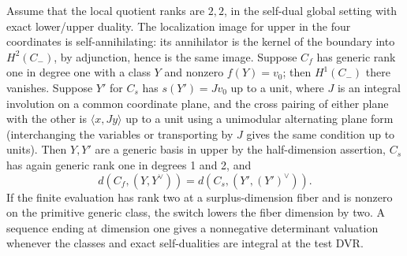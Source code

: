 \begin{lemma}\label{lem:foundations-square}
Assume that the local quotient ranks are \(2,2\), in the self-dual global setting with exact lower/upper duality. The localization image for upper in the four coordinates is self-annihilating: its annihilator is the kernel of the boundary into \(H^2(C_-)\), by adjunction, hence is the same image. Suppose \(C_f\) has generic rank one in degree one with a class \(Y\) and nonzero \(f(Y)=v_0\); then \(H^1(C_-)\) there vanishes. Suppose \(Y'\) for \(C_s\) has \(s(Y')=J v_0\) up to a unit, where \(J\) is an integral involution on a common coordinate plane, and the cross pairing of either plane with the other is \(\langle x,Jy\rangle\) up to a unit using a unimodular alternating plane form (interchanging the variables or transporting by \(J\) gives the same condition up to units). Then \(Y,Y'\) are a generic basis in upper by the half-dimension assertion, \(C_s\) has again generic rank one in degrees 1 and 2, and
\[
                    d(C_f,(Y,Y^\vee))=d(C_s,(Y',(Y')^\vee)).
\]
If the finite evaluation has rank two at a surplus-dimension fiber and is nonzero on the primitive generic class, the switch lowers the fiber dimension by two. A sequence ending at dimension one gives a nonnegative determinant valuation whenever the classes and exact self-dualities are integral at the test DVR.
\end{lemma}

